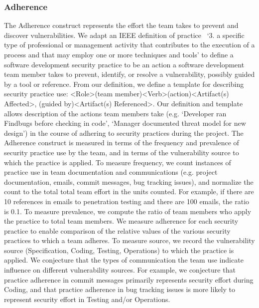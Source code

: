 \subsubsection{Adherence}
\label{sec:model_contruct_adherence}
The Adherence construct represents the effort the team takes to prevent and discover vulnerabilities. We adapt an IEEE definition of practice~\cite{ieee1990glossary} `3. a specific type of professional or management activity that contributes to 
the execution of a process and that may employ one or more techniques and tools' to define a software development security practice to be an action a software development team member takes to prevent, identify, or resolve a vulnerability, possibly guided by a tool or reference. From our definition, we define a template for describing security practice use: \textless Role\textgreater (team member)\textless Verb\textgreater (action)\textless Artifact(s) Affected\textgreater, (guided by)\textless Artifact(s) Referenced\textgreater. Our definition and template allows description of the actions team members take (e.g. `Developer ran Findbugs before checking in code', `Manager documented threat model for new design') in the course of adhering to security practices during the project. The Adherence construct is measured in terms of the frequency and prevalence of security practice use by the team, and in terms of the vulnerability source to which the practice is applied. To measure frequency, we count instances of practice use in team documentation and communications (e.g. project documentation, emails, commit messages, bug tracking issues), and normalize the count to the total total team effort in the units counted. For example, if there are 10 references in emails to penetration testing and there are 100 emails, the ratio is 0.1.  To measure prevalence, we compute the ratio of team members who apply the practice to total team members. We measure adherence for each security practice to enable comparison of the relative values of the various security practices to which a team adheres. To measure source, we record the vulnerability source (Specification, Coding, Testing, Operations) to which the practice is applied. We conjecture that the types of communication the team use indicate influence on different vulnerability sources. For example, we conjecture that practice adherence in commit messages primarily represents security effort during Coding,  and that practice adherence in bug tracking issues is more likely to represent security effort in Testing and/or Operations. 

